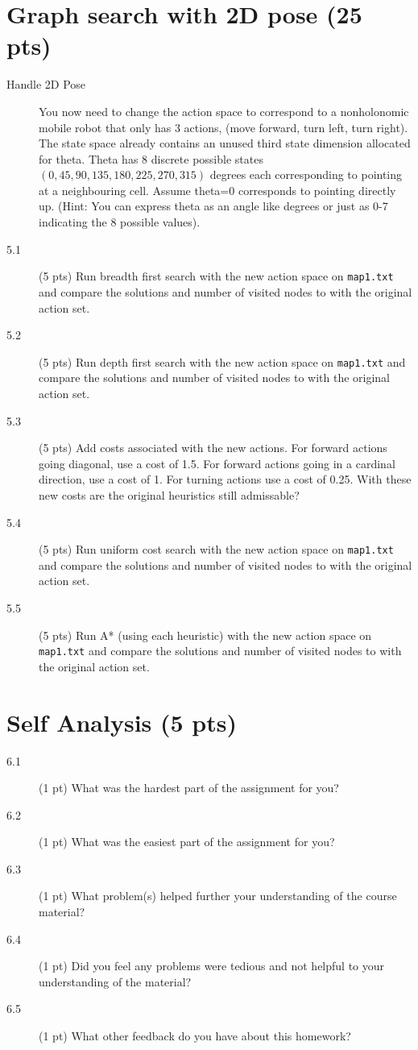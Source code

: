 \documentclass[11pt]{hermans-hw}
\begin{document}
\section{Graph search with 2D pose (25 pts)}
\begin{description}
\item[Handle 2D Pose]You now need to change the action space to correspond to a nonholonomic mobile robot that only has 3 actions, (move forward, turn left, turn right). The state space already contains an unused third state dimension allocated for theta. Theta has 8 discrete possible states $(0,45,90,135,180,225,270,315)$ degrees each corresponding to pointing at a neighbouring cell. Assume theta=0 corresponds to pointing directly up. (Hint: You can express theta as an angle like degrees or just as 0-7 indicating the 8 possible values). 
\item[5.1] (5 pts) Run breadth first search with the new action space on \texttt{map1.txt} and compare the solutions and number of visited nodes to with the original action set.
\item[5.2] (5 pts) Run depth first search with the new action space on \texttt{map1.txt} and compare the solutions and number of visited nodes to with the original action set.
\item[5.3] (5 pts) Add costs associated with the new actions. For forward actions going diagonal, use a cost of 1.5. For forward actions going in a cardinal direction, use a cost of 1. For turning actions use a cost of 0.25. With these new costs are the original heuristics still admissable?
\item[5.4] (5 pts) Run uniform cost search with the new action space on \texttt{map1.txt} and compare the solutions and number of visited nodes to with the original action set.
\item[5.5] (5 pts) Run A* (using each heuristic) with the new action space on \texttt{map1.txt} and compare the solutions and number of visited nodes to with the original action set.
\end{description}


\section{Self Analysis (5 pts)}
\begin{description}
\item[6.1] (1 pt) What was the hardest part of the assignment for you?
\item[6.2] (1 pt) What was the easiest part of the assignment for you?
\item[6.3] (1 pt) What problem(s) helped further your understanding of the course material?
\item[6.4] (1 pt) Did you feel any problems were tedious and not helpful to your understanding of the material?
\item[6.5] (1 pt) What other feedback do you have about this homework?
\end{description}
\end{document}
